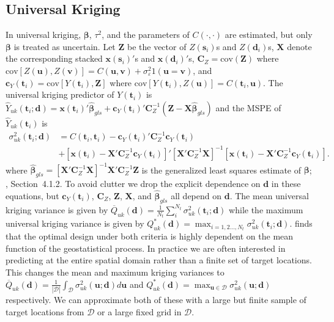 \documentclass[cmbright]{staauth}
\newcommand{\cov}{\mathrm{cov}}
\begin{document}
\subsection{Universal Kriging}
In universal kriging, $\bm{\beta}$, $\tau^2$, and the parameters of $C(\cdot,\cdot)$ are estimated, but only $\bm{\beta}$ is treated as uncertain. Let $\bm{Z}$ be the vector of $Z(\bm{s}_i)$s and $Z(\bm{d}_i)$s, $\bm{X}$ denote the corresponding stacked $\bm{x}(\bm{s}_i)'$s and $\bm{x}(\bm{d}_i)'$s, $\bm{C}_Z = \cov(\bm{Z})$ where $\cov[Z(\bm{u}), Z(\bm{v})] = C(\bm{u},\bm{v}) + \sigma^2_\varepsilon 1(\bm{u} = \bm{v})$, and $\bm{c}_Y(\bm{t}_i) = \cov[Y(\bm{t}_i), \bm{Z}]$ where $\cov[Y(\bm{t}_i), Z(\bm{u})] = C(\bm{t}_i, \bm{u})$. The universal kriging predictor of $Y(\bm{t}_i)$ is $\widehat{Y}_{uk}(\bm{t}_i;\bm{d}) = \bm{x}(\bm{t}_i)'\widehat{\bm{\beta}}_{gls} + \bm{c}_Y(\bm{t}_i)'\bm{C}_Z^{-1}(\bm{Z} - \bm{X}\widehat{\bm{\beta}}_{gls})$ and the MSPE of $\widehat{Y}_{uk}(\bm{t}_i)$ is
\begin{align*}
\sigma_{uk}^2(\bm{t}_i;\bm{d}) &= C(\bm{t}_i, \bm{t}_i) - \bm{c}_Y(\bm{t}_i)'\bm{C}_Z^{-1}\bm{c}_Y(\bm{t}_i)  \\
& + [\bm{x}(\bm{t}_i)  - \bm{X}'\bm{C}_Z^{-1}\bm{c}_Y(\bm{t}_i)]'[\bm{X}'\bm{C}_Z^{-1}\bm{X}]^{-1}[\bm{x}(\bm{t}_i)  - \bm{X}'\bm{C}_Z^{-1}\bm{c}_Y(\bm{t}_i)].
\end{align*}
where $\widehat{\bm{\beta}}_{gls} = [\bm{X}'\bm{C}_Z^{-1}\bm{X}]^{-1}\bm{X}'\bm{C}_Z^{-1}\bm{Z}$ is the generalized least squares estimate of $\bm{\beta}$; \cite{cressie2011statistics}, Section~4.1.2. To avoid clutter we drop the explicit dependence on $\bm{d}$ in these equations, but $\bm{c}_Y(\bm{t}_i)$, $\bm{C}_Z$, $\bm{Z}$, $\bm{X}$, and $\widehat{\bm{\beta}}_{gls}$ all depend on $\bm{d}$. The mean universal kriging variance is given by $\overline{Q}_{uk}(\bm{d}) = \frac{1}{N_t}\sum_{i}^{N_t}\sigma^2_{uk}(\bm{t}_i;\bm{d})$ while the maximum universal kriging variance is given by $Q_{uk}^*(\bm{d}) = \max_{i=1,2\dots,N_t}\sigma^2_{uk}(\bm{t}_i;\bm{d})$. \cite{zimmerman2006optimal} finds that the optimal design under both criteria is highly dependent on the mean function of the geostatistical process. In practice we are often interested in predicting at the entire spatial domain rather than a finite set of target locations. This changes the mean and maximum kriging variances to $\overline{Q}_{uk}(\bm{d}) = \frac{1}{|\mathcal{D}|}\int_{\mathcal{D}}\sigma^2_{uk}(\bm{u};\bm{d})d\bm{u}$ and $Q_{uk}^*(\bm{d}) = \max_{\bm{u}\in\mathcal{D}}\sigma^2_{uk}(\bm{u};\bm{d})$ respectively. We can approximate both of these with a large but finite sample of target locations from $\mathcal{D}$ or a large fixed grid in $\mathcal{D}$.
\end{document}
